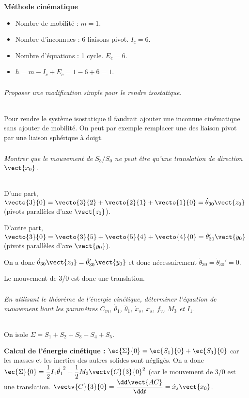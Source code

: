 \begin{multicols}{2}
\begin{corrige}
\textbf{Méthode cinématique}

\begin{itemize}
\item Nombre de mobilité : $m=1$.
\item Nombre d'inconnues : 6 liaisons pivot. $I_c=6$. 
\item Nombre d'équations : 1 cycle. $E_c = 6$. 
\item $h=m-I_c+E_c = 1-6+6=1$. 
\end{itemize}

\end{corrige}
\else
\fi


\subparagraph{}\textit{Proposer une modification simple pour le rendre isostatique.}
\ifprof
\begin{corrige}~\\
Pour rendre le système isostatique il faudrait ajouter une inconnue cinématique sans ajouter de mobilité. On peut par exemple remplacer une des liaison pivot par une liaison sphérique à doigt. 
\end{corrige}
\else
\fi


\subparagraph{}\textit{Montrer que le mouvement de $S_3/S_0$ ne peut être qu’une translation de direction $\vect{x_0}$.}
\ifprof
\begin{corrige}~\\

D'une part, $\vecto{3}{0}=\vecto{3}{2}+\vecto{2}{1}+\vecto{1}{0}=\dot{\theta}_{30}\vect{z_0}$ (pivots parallèles d'axe $\vect{z_0}$).

D'autre part, $\vecto{3}{0}=\vecto{3}{5}+\vecto{5}{4}+\vecto{4}{0}=\dot{\theta}_{30}'\vect{y_0}$ (pivots parallèles d'axe $\vect{y_0}$).

On a donc $\dot{\theta}_{30}\vect{z_0} = \dot{\theta}_{30}'\vect{y_0}$ et donc nécessairement $\dot{\theta}_{30}=\dot{\theta}_{30}'=0$. 

Le mouvement de 3/0 est donc une translation. 
\end{corrige}
\else
\fi


\subparagraph{}\textit{En utilisant le théorème de l’énergie cinétique, déterminer l’équation de mouvement liant
les paramètres $C_m$, $\dot{\theta}_1$, $\ddot{\theta}_1$, $\dot{x}_s$, $\ddot{x}_s$, $f_v$, $M_3$ et $I_1$.}
\ifprof
\begin{corrige}~\\
On isole $\Sigma = S_1 +S_2 + S_3 + S_4 + S_5$.

\textbf{Calcul de l'énergie cinétique :} $\ec{\Sigma}{0}=\ec{S_1}{0}+\ec{S_3}{0}$ car les masses et les inerties des autres solides sont négligés.  On a donc $\ec{\Sigma}{0}=\dfrac{1}{2}I_1\dot{\theta_1}^2 + \dfrac{1}{2}M_3 \vectv{C}{3}{0} ^2$ (car le mouvement de 3/0 est une translation. $\vectv{C}{3}{0}=\dfrac{\dd \vect{AC}}{\dd t}=\dot{x}_s \vect{x_0}$.


\end{corrige}
\end{multicols}
